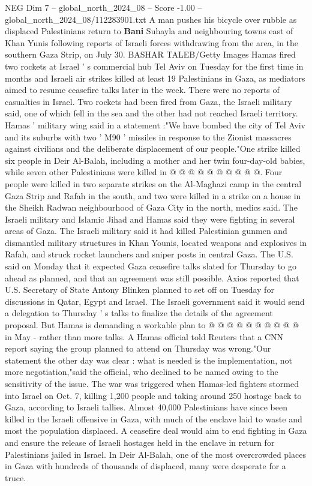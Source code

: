 \begin{textsample}{NEG Dim 7 – global\_north\_2024\_08 – Score -1.00 – global\_north\_2024\_08/112283901.txt}  \label{ex:f7_neg_443}
A man pushes his bicycle over rubble as displaced Palestinians return to \textbf{Bani} Suhayla and neighbouring towns east of Khan Yunis following reports of Israeli forces withdrawing from the area, in the southern Gaza Strip, on July 30.
BASHAR TALEB/Getty Images Hamas fired two rockets at Israel ' s commercial hub Tel Aviv on Tuesday for the first time in months and Israeli air strikes killed at least 19 Palestinians in Gaza, as mediators aimed to resume ceasefire talks later in the week.
There were no reports of casualties in Israel.
Two rockets had been fired from Gaza, the Israeli military said, one of which fell in the sea and the other had not reached Israeli territory.
Hamas ' military wing said in a statement :"We have bombed the city of Tel Aviv and its suburbs with two ' M90 ' missiles in response to the Zionist massacres against civilians and the deliberate displacement of our people."One strike killed six people in Deir Al-Balah, including a mother and her twin four-day-old babies, while seven other Palestinians were killed in @ @ @ @ @ @ @ @ @ @.
Four people were killed in two separate strikes on the Al-Maghazi camp in the central Gaza Strip and Rafah in the south, and two were killed in a strike on a house in the Sheikh Radwan neighbourhood of Gaza City in the north, medics said.
The Israeli military and Islamic Jihad and Hamas said they were fighting in several areas of Gaza.
The Israeli military said it had killed Palestinian gunmen and dismantled military structures in Khan Younis, located weapons and explosives in Rafah, and struck rocket launchers and sniper posts in central Gaza.
The U.S. said on Monday that it expected Gaza ceasefire talks slated for Thursday to go ahead as planned, and that an agreement was still possible.
Axios reported that U.S.
Secretary of State Antony Blinken planned to set off on Tuesday for discussions in Qatar, Egypt and Israel.
The Israeli government said it would send a delegation to Thursday ' s talks to finalize the details of the agreement proposal.
But Hamas is demanding a workable plan to @ @ @ @ @ @ @ @ @ @ in May - rather than more talks.
A Hamas official told Reuters that a CNN report saying the group planned to attend on Thursday was wrong."Our statement the other day was clear : what is needed is the implementation, not more negotiation,"said the official, who declined to be named owing to the sensitivity of the issue.
The war was triggered when Hamas-led fighters stormed into Israel on Oct. 7, killing 1,200 people and taking around 250 hostage back to Gaza, according to Israeli tallies.
Almost 40,000 Palestinians have since been killed in the Israeli offensive in Gaza, with much of the enclave laid to waste and most the population displaced.
A ceasefire deal would aim to end fighting in Gaza and ensure the release of Israeli hostages held in the enclave in return for Palestinians jailed in Israel.
In Deir Al-Balah, one of the most overcrowded places in Gaza with hundreds of thousands of displaced, many were desperate for a truce.

\end{textsample}
